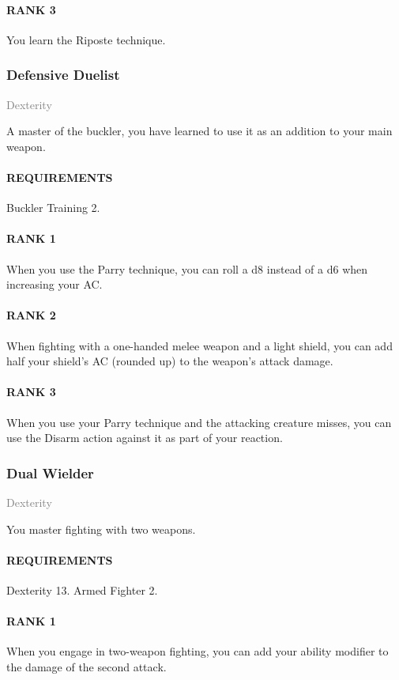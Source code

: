 \paragraph{RANK 3} You learn the Riposte technique.

\subsubsection{Defensive Duelist} \label{feat::defensiveduelist}
\small{\textcolor{gray}{Dexterity}}

\normalsize
A master of the buckler, you have learned to use it as an addition to your main weapon.
\paragraph{REQUIREMENTS} Buckler Training 2.
\paragraph{RANK 1} When you use the Parry technique, you can roll a d8 instead of a d6 when increasing your AC.
\paragraph{RANK 2} When fighting with a one-handed melee weapon and a light shield, you can add half your shield's AC (rounded up) to the weapon's attack damage.
\paragraph{RANK 3} When you use your Parry technique and the attacking creature misses, you can use the Disarm action against it as part of your reaction.

\subsubsection{Dual Wielder} \label{feat::dualwielder}
\small{\textcolor{gray}{Dexterity}}

\normalsize
You master fighting with two weapons.
\paragraph{REQUIREMENTS} Dexterity 13. Armed Fighter 2.
\paragraph{RANK 1} When you engage in two-weapon fighting, you can add your ability modifier to the damage of the second attack.
